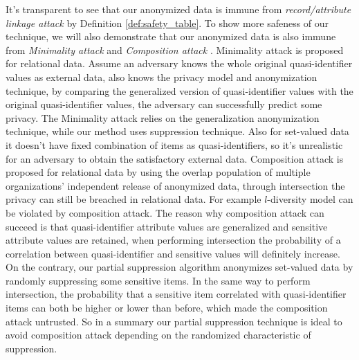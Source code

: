 It's transparent to see that our anonymized data is immune from {\em
record/attribute linkage attack} \cite{FungWCY10:Survey} by Definition
\ref{def:safety_table}. To show more safeness of our technique, we will also
demonstrate that our anonymized data is also immune from {\em Minimality
attack} \cite{Wong:2007:Minimality} and {\em Composition attack}
\cite{Ganta:2008:Composition}. Minimality attack \cite{Wong:2007:Minimality}
is proposed for relational data. Assume an adversary knows the whole original
quasi-identifier values as external data, also knows the privacy model and
anonymization technique, by comparing the generalized version of
quasi-identifier values with the original quasi-identifier values, the
adversary can successfully predict some privacy. The Minimality attack relies
on the generalization anonymization technique, while our method uses
suppression technique. Also for set-valued data it doesn't have fixed
combination of items as quasi-identifiers, so it's unrealistic for an
adversary to obtain the satisfactory external data. Composition attack
\cite{Ganta:2008:Composition} is proposed for relational data by using the
overlap population of multiple organizations' independent release of
anonymized data, through intersection the privacy can still be breached in
relational data. For example $l$-diversity \cite{Ganta:2008:Composition}
model can be violated by composition attack. The reason why composition
attack can succeed is that quasi-identifier attribute values are generalized
and sensitive attribute values are retained, when performing intersection the
probability of a correlation between quasi-identifier and sensitive values
will definitely increase. On the contrary, our partial suppression algorithm
anonymizes set-valued data by randomly suppressing some sensitive items. In
the same way to perform intersection,
 the probability that a sensitive item correlated with quasi-identifier items can
both be higher or lower than before, which made the composition attack
untrusted. So in a summary our partial suppression technique is ideal to
avoid composition attack depending on the randomized characteristic of
suppression.

